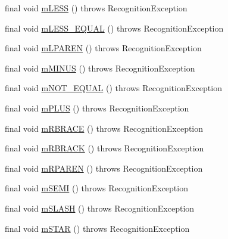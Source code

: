 \begin{DoxyCompactItemize}
\item 
final void \hyperlink{classorg_1_1tzi_1_1use_1_1parser_1_1use_1_1_u_s_e_lexer_a165252bc0074c1f73f65ce54de194ae5}{m\-L\-E\-S\-S} ()  throws Recognition\-Exception 
\item 
final void \hyperlink{classorg_1_1tzi_1_1use_1_1parser_1_1use_1_1_u_s_e_lexer_a42fee89c27d9ae028f7cf2102b379b37}{m\-L\-E\-S\-S\-\_\-\-E\-Q\-U\-A\-L} ()  throws Recognition\-Exception 
\item 
final void \hyperlink{classorg_1_1tzi_1_1use_1_1parser_1_1use_1_1_u_s_e_lexer_a7f4b01bb1b89923faa306ed8a5337864}{m\-L\-P\-A\-R\-E\-N} ()  throws Recognition\-Exception 
\item 
final void \hyperlink{classorg_1_1tzi_1_1use_1_1parser_1_1use_1_1_u_s_e_lexer_ad49fed7cb9aedc7b8393bcec642ef7e3}{m\-M\-I\-N\-U\-S} ()  throws Recognition\-Exception 
\item 
final void \hyperlink{classorg_1_1tzi_1_1use_1_1parser_1_1use_1_1_u_s_e_lexer_a63d383d37c67106352250215b18c3204}{m\-N\-O\-T\-\_\-\-E\-Q\-U\-A\-L} ()  throws Recognition\-Exception 
\item 
final void \hyperlink{classorg_1_1tzi_1_1use_1_1parser_1_1use_1_1_u_s_e_lexer_a4c416f36585315c162eca0cf12e128cf}{m\-P\-L\-U\-S} ()  throws Recognition\-Exception 
\item 
final void \hyperlink{classorg_1_1tzi_1_1use_1_1parser_1_1use_1_1_u_s_e_lexer_a7fb415aa8f9437edcb28ffff68f6b20d}{m\-R\-B\-R\-A\-C\-E} ()  throws Recognition\-Exception 
\item 
final void \hyperlink{classorg_1_1tzi_1_1use_1_1parser_1_1use_1_1_u_s_e_lexer_afe33a328ddc963187a5e3663eccde448}{m\-R\-B\-R\-A\-C\-K} ()  throws Recognition\-Exception 
\item 
final void \hyperlink{classorg_1_1tzi_1_1use_1_1parser_1_1use_1_1_u_s_e_lexer_ab9b6e6c7822730d914a617c07f44a722}{m\-R\-P\-A\-R\-E\-N} ()  throws Recognition\-Exception 
\item 
final void \hyperlink{classorg_1_1tzi_1_1use_1_1parser_1_1use_1_1_u_s_e_lexer_aeb329b277e8c9dba17aa2270e0ee7dd8}{m\-S\-E\-M\-I} ()  throws Recognition\-Exception 
\item 
final void \hyperlink{classorg_1_1tzi_1_1use_1_1parser_1_1use_1_1_u_s_e_lexer_a74b613fc8b0206f1bb938a83708ae6e7}{m\-S\-L\-A\-S\-H} ()  throws Recognition\-Exception 
\item 
final void \hyperlink{classorg_1_1tzi_1_1use_1_1parser_1_1use_1_1_u_s_e_lexer_aaa7e74c0a671640897c163e49be3e55f}{m\-S\-T\-A\-R} ()  throws Recognition\-Exception 
\item 

\end{DoxyCompactItemize}
